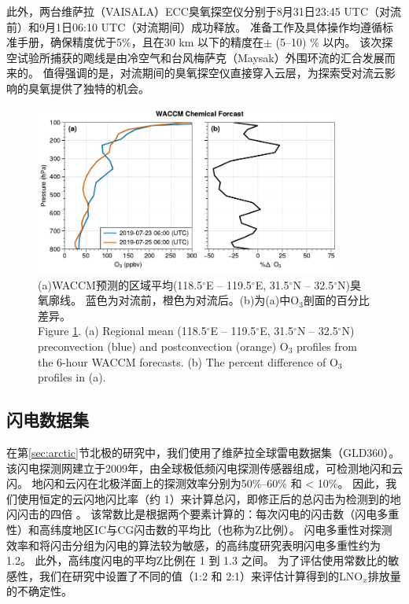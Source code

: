 此外，两台维萨拉（VAISALA）ECC臭氧探空仪分别于8月31日23:45 UTC（对流前）和9月1日06:10 UTC（对流期间）成功释放。
准备工作及具体操作均遵循标准手册，确保精度优于5\%，且在30 km 以下的精度在$\pm$ (5--10) \% 以内\citep{Smit.2007}。
该次探空试验所捕获的飑线是由冷空气和台风梅萨克（Maysak）外围环流的汇合发展而来的。
值得强调的是，对流期间的臭氧探空仪直接穿入云层，为探索受对流云影响的臭氧提供了独特的机会。



\begin{figure}[!htbp]
\centering
\includegraphics[width=0.9\textwidth]{./figures/waccm_forcast_o3.pdf}
\caption{(a)WACCM预测的区域平均(118.5$^{\circ}$E -- 119.5$^{\circ}$E, 31.5$^{\circ}$N – 32.5$^{\circ}$N)臭氧廓线。
蓝色为对流前，橙色为对流后。(b)为(a)中O$_3$剖面的百分比差异。\\
Figure \ref{fig:waccm_forcast_o3}. (a) Regional mean (118.5$^{\circ}$E – 119.5$^{\circ}$E, 31.5$^{\circ}$N – 32.5$^{\circ}$N)
preconvection (blue) and postconvection (orange) O$_3$ profiles from the 6-hour WACCM forecasts.
(b) The percent difference of O$_3$ profiles in (a).
}
\label{fig:waccm_forcast_o3}
\end{figure}

\subsection{闪电数据集}

在第\ref{sec:arctic}节北极的研究中，我们使用了维萨拉全球雷电数据集（GLD360）。
该闪电探测网建立于2009年，由全球极低频闪电探测传感器组成，可检测地闪和云闪\citep{Said.2010,Said.2013,Said.2017}。
地闪和云闪在北极洋面上的探测效率分别为50\%--60\% 和 < 10\%\citep{Vagasky.2022}。
因此，我们使用恒定的云闪地闪比率（约 1）来计算总闪，即修正后的总闪击为检测到的地闪闪击的四倍
\citep{Mackerras.1994,Prentice.1977}。
该常数比是根据两个要素计算的：每次闪电的闪击数（闪电多重性）和高纬度地区IC与CG闪击数的平均比（也称为Z比例）。
闪电多重性对探测效率和将闪击分组为闪电的算法较为敏感\citep{Schulz.2005,Yair.2014,Burgesser.2017,Kolmasova.2022}，\citet{Yusop.2019}的高纬度研究表明闪电多重性约为1.2。
此外，高纬度闪电的平均Z比例在 1 到 1.3 之间\citep{Mackerras.1994,Prentice.1977,Bandholnopparat.2020}。
为了评估使用常数比的敏感性，我们在研究中设置了不同的值（1:2 和 2:1）来评估计算得到的LNO$_x$排放量的不确定性。


